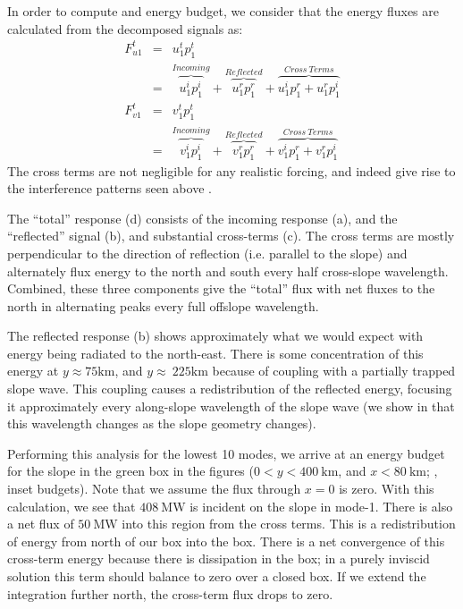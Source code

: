 \documentclass[10pt]{article}
\begin{document}
In order to compute and energy budget, we consider that the energy fluxes are calculated from the decomposed signals as:
\begin{eqnarray}
  F_{u1}^t & = & u_1^t p_1^t \\
  &= & \overbrace{u_1^ip_1^i}^{Incoming} + \overbrace{u_1^rp_1^r}^{Reflected} + 
  \overbrace{u_1^ip_1^r + u_1^rp_1^i}^{Cross\ Terms} \\
  F_{v1}^t & = & v_1^t p_1^t \\
  &= & \overbrace{v_1^ip_1^i}^{Incoming} + \overbrace{v_1^rp_1^r}^{Reflected} + 
  \overbrace{v_1^ip_1^r + v_1^rp_1^i}^{Cross\ Terms} 
\end{eqnarray}
The cross terms are not negligible for any realistic forcing, and indeed give rise to the interference patterns seen above \citep{nashetal04a,martinietal07}. 

The ``total'' response (d) consists of the incoming response (a), and the ``reflected'' signal (b), and substantial cross-terms (c).  The cross terms are mostly perpendicular to the direction of reflection (i.e. parallel to the slope) and alternately flux energy to the north and south every half cross-slope wavelength.  Combined, these three components give the ``total'' flux with net fluxes to the north in alternating peaks every full offslope wavelength.  

The reflected response (b) shows approximately what we would expect with energy being radiated to the north-east.  There is some concentration of this energy at $y\approx \mathrm{75 km}$, and  $y\approx\ \mathrm{225 km}$ because of coupling with a partially trapped slope wave.  This coupling causes a redistribution of the reflected energy, focusing it approximately every along-slope wavelength of the slope wave (we show in  that this wavelength changes as the slope geometry changes).  

Performing this analysis for the lowest 10 modes, we arrive at an energy budget for the slope in the green box in the figures ($0<y<400\ \mathrm{km}$, and $x<80\ \mathrm{km}$; , inset budgets).   Note that we assume the flux through $x=0$ is zero.   With this calculation, we see that $408\ \mathrm{MW}$ is incident on the slope in mode-1.  There is also a net flux  of $50\ \mathrm{MW}$ into this region from the cross terms.  This is a redistribution of energy from north of our box into the box.  There is a net convergence of this cross-term energy because there is dissipation in the box; in a purely inviscid solution this term should balance to zero over a closed box.  If we extend the integration further north, the cross-term flux drops to zero.  
\end{document}
